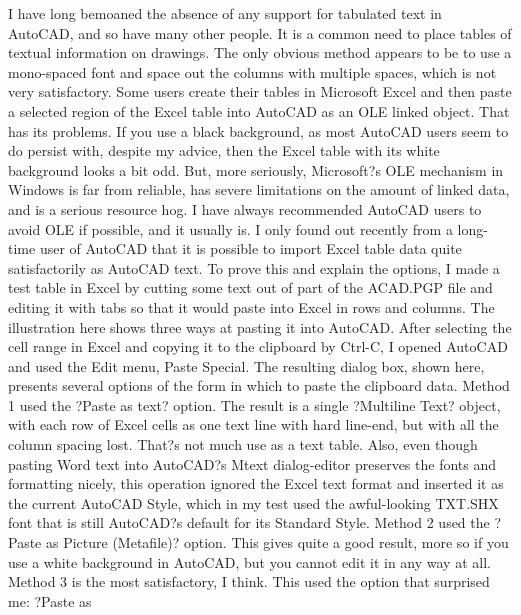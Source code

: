 \documentclass[a4paper]{article}
\newcommand\partone[1]{{   \fontspec{CAMBERIC.TTF} \fontsize{16}{32} \selectfont #1}}
\begin{document}
\partone{

I have long bemoaned the absence of any support for tabulated text in AutoCAD, and so have many other people. It is a common need to place tables of textual information on drawings. The only obvious method appears to be to use a mono-spaced font and space out the columns with multiple spaces, which is not very satisfactory.
Some users create their tables in Microsoft Excel and then paste a selected region of the Excel table into AutoCAD as an OLE linked object. That has its problems. If you use a black background, as most AutoCAD users seem to do persist with, despite my advice, then the Excel table with its white background looks a bit odd. But, more seriously, Microsoft?s OLE mechanism in Windows is far from reliable, has severe limitations on the amount of linked data, and is a serious resource hog. I have always recommended AutoCAD users to avoid OLE if possible, and it usually is.
I only found out recently from a long-time user of AutoCAD that it is possible to import Excel table data quite satisfactorily as AutoCAD text. To prove this and explain the options, I made a test table in Excel by cutting some text out of part of the ACAD.PGP file and editing it with tabs so that it would paste into Excel in rows and columns. The illustration here shows three ways at pasting it into AutoCAD. After selecting the cell range in Excel and copying it to the clipboard by Ctrl-C, I opened AutoCAD and used the Edit menu, Paste Special. The resulting dialog box, shown here, presents several options of the form in which to paste the clipboard data.
Method 1 used the ?Paste as text? option. The result is a single ?Multiline Text? object, with each row of Excel cells as one text line with hard line-end, but with all the column spacing lost. That?s not much use as a text table. Also, even though pasting Word text into AutoCAD?s Mtext dialog-editor preserves the fonts and formatting nicely, this operation ignored the Excel text format and inserted it as the current AutoCAD Style, which in my test used the awful-looking TXT.SHX font that is still AutoCAD?s default for its Standard Style.
Method 2 used the ?Paste as Picture (Metafile)? option. This gives quite a good result, more so if you use a white background in AutoCAD, but you cannot edit it in any way at all. 
Method 3 is the most satisfactory, I think. This used the option that surprised me: ?Paste as %
}
\end{document}
